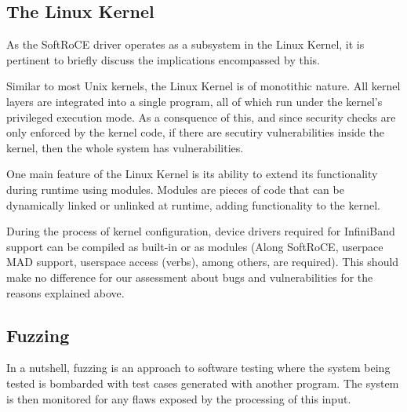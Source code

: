 
\subsection{The Linux Kernel}


As the SoftRoCE driver operates as a subsystem in the Linux Kernel, it is pertinent to briefly
discuss the implications encompassed by this.

Similar to most Unix kernels, the Linux Kernel is of monotithic nature. All kernel layers
are integrated into a single program, all of which run under the kernel's privileged execution
mode. As a consquence of this, and since security checks are only enforced by the kernel code,
if there are secutiry vulnerabilities inside the kernel, then the whole system has vulnerabilities.

One main feature of the Linux Kernel is its ability to extend its functionality during runtime using
modules. Modules are pieces of code that can be dynamically linked or unlinked at runtime,
adding functionality to the kernel\cite{korbethLinuxDeviceDrivers2005}.

During the process of kernel configuration, device drivers required for InfiniBand support can
be compiled as built-in or as modules (Along SoftRoCE, userpace MAD support,
userspace access (verbs), among others, are required). This should make no difference for our assessment
about bugs and vulnerabilities for the reasons explained above.


\subsection{Fuzzing}

In a nutshell, fuzzing is an approach to software testing where the system being tested is bombarded with test cases generated with another program. The system is then monitored for any flaws exposed by the processing of
this input\cite{mcnallyFuzzingStateArt2012}.


